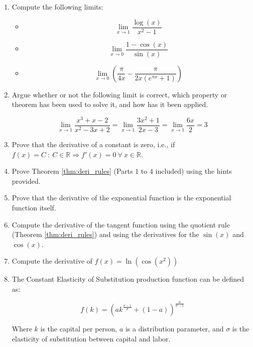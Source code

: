 \documentclass[a4paper,11pt]{article}
\theoremstyle{definition}
\theoremstyle{plain}
\begin{document}
\begin{enumerate}
\item Compute the following limits:

    \begin{itemize}
   
    \item
    \[\displaystyle\lim_{x\rightarrow 1}{\dfrac{\log(x)}{x^2 - 1}}\]
    \item
    \[\displaystyle\lim_{x\rightarrow 0}{\dfrac{1-\cos(x)}{\sin(x)}}\]
    \item
    \[
    \lim_{x\rightarrow 0}\left(\frac{\pi}{4x} - \frac{\pi}{2x(e^{\pi x}+1)}\right)
    \]
    \end{itemize}

\item Argue whether or not the following limit is correct, which property or theorem has been used to solve it, and how has it been applied.

\[
\lim_{x\rightarrow 1}\frac{x^3+x-2}{x^2-3x+2} = \lim_{x\rightarrow 1}\frac{3x^2+1}{2x-3} = \lim_{x\rightarrow 1}\frac{6x}{2} = 3
\]

\item Prove that the derivative of a constant is zero, i.e., if $f(x) = C \: : \: C\in\mathbb{R} \Rightarrow f'(x) = 0 \: \forall \: x\in\mathbb{R}$.

\item Prove Theorem \ref{thm:deri_rules} (Parts $1$ to $4$ included) using the hints provided.


\item Prove that the derivative of the exponential function is the exponential function itself.

\item Compute the derivative of the tangent function using the quotient rule (Theorem \ref{thm:deri_rules}) and using the derivatives for the \(\sin(x)\) and \(\cos(x)\).

\item Compute the derivative of \(f(x) = \ln\left(\cos\left(x^2\right)\right)\)

\item The Constant Elasticity of Substitution production
function can be defined as:

\[
f(k) = \left(a k^{\frac{\sigma-1}{\sigma}} + (1-a)\right)^{\frac{\sigma}{\sigma-1}}
\]

Where \(k\) is the capital per person, \(a\) is a distribution
parameter, and \(\sigma\) is the elasticity of substitution between
capital and labor.


\end{enumerate}
\end{document}
